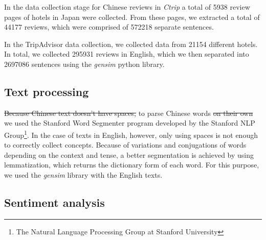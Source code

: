 \documentclass[review]{elsarticle}
\providecommand{\DIFadd}[1]{{\protect\color{blue}\uwave{#1}}} %
\providecommand{\DIFdel}[1]{{\protect\color{red}\sout{#1}}}                      %
\providecommand{\DIFaddbegin}{} %
\providecommand{\DIFaddend}{} %
\providecommand{\DIFdelbegin}{} %
\providecommand{\DIFdelend}{} %
\newcommand{\DIFscaledelfig}{0.5}
\newlength{\DIFdelgraphicswidth} %
\newlength{\DIFdelgraphicsheight} %
\newcommand{\DIFaddincludegraphics}[2][]{{\color{blue}\fbox{\DIFOincludegraphics[#1]{#2}}}} %
\newcommand{\DIFdelincludegraphics}[2][]{%
\sbox{\DIFdelgraphicsbox}{\DIFOincludegraphics[#1]{#2}}%
\settoboxwidth{\DIFdelgraphicswidth}{\DIFdelgraphicsbox} %
\settoboxtotalheight{\DIFdelgraphicsheight}{\DIFdelgraphicsbox} %
\scalebox{\DIFscaledelfig}{%
\parbox[b]{\DIFdelgraphicswidth}{\usebox{\DIFdelgraphicsbox}\\[-\baselineskip] \rule{\DIFdelgraphicswidth}{0em}}\llap{\resizebox{\DIFdelgraphicswidth}{\DIFdelgraphicsheight}{%
\setlength{\unitlength}{\DIFdelgraphicswidth}%
\begin{picture}(1,1)%
\thicklines\linethickness{2pt} %
{\color[rgb]{1,0,0}\put(0,0){\framebox(1,1){}}}%
{\color[rgb]{1,0,0}\put(0,0){\line( 1,1){1}}}%
{\color[rgb]{1,0,0}\put(0,1){\line(1,-1){1}}}%
\end{picture}%
}\hspace*{3pt}}} %
} %
\DeclareRobustCommand{\DIFaddbegin}{\DIFOaddbegin \let\includegraphics\DIFaddincludegraphics} %
\DeclareRobustCommand{\DIFaddend}{\DIFOaddend \let\includegraphics\DIFOincludegraphics} %
\DeclareRobustCommand{\DIFdelbegin}{\DIFOdelbegin \let\includegraphics\DIFdelincludegraphics} %
\DeclareRobustCommand{\DIFdelend}{\DIFOaddend \let\includegraphics\DIFOincludegraphics} %
\begin{document}
In the data collection stage for Chinese reviews in \textit{Ctrip} a total of \num[group-separator={,}]{5938} review pages of hotels in Japan were collected. From these pages, we extracted a total of \num[group-separator={,}]{44177} reviews, which were comprised of \num[group-separator={,}]{572218} separate sentences. 

\DIFdelbegin %

\DIFdelend In the TripAdvisor data collection, we collected data from \num[group-separator={,}]{21154} different hotels. In total, we collected \num[group-separator={,}]{295931} reviews in English, which we then separated into \num[group-separator={,}]{2697086} sentences using the \textit{gensim} python library. 

\subsection{Text processing}\label{textprocessing}

\DIFdelbegin \DIFdel{Because Chinese text doesn't have spaces, }\DIFdelend \DIFaddbegin \DIFadd{In order }\DIFaddend to parse Chinese words \DIFdelbegin \DIFdel{on their own }\DIFdelend \DIFaddbegin \DIFadd{and separate them }\DIFaddend we used the Stanford Word Segmenter \cite[][]{chang2008} program developed by the Stanford NLP Group\footnote{\label{stanfordnlp}The Natural Language Processing Group at Stanford University}. In the case of texts in English, however, only using spaces is not enough to correctly collect concepts. Because of variations and conjugations of words depending on the context and tense, a better segmentation is achieved by using lemmatization, which returns the dictionary form of each word. For this purpose, we used the \textit{gensim} library with the English texts.

\subsection{Sentiment analysis}\label{sentimentanalysis}
\end{document}
